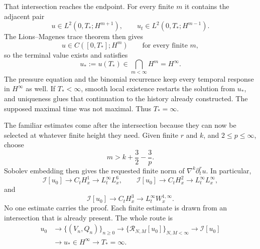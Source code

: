\documentclass[11pt]{article}
\begin{document}
That intersection reaches the endpoint. For every finite $m$ it contains the adjacent pair
\[
u\in L^2(0,T_*;H^{m+1}),
\qquad
u_t\in L^2(0,T_*;H^{m-1}).
\]
The Lions--Magenes trace theorem then gives
\[
u\in C([0,T_*];H^m)
\qquad\text{for every finite }m,
\]
so the terminal value exists and satisfies
\[
u_*:=u(T_*)\in\bigcap_{m<\infty}H^m=H^\infty.
\]
The pressure equation and the binomial recurrence keep every temporal response in $H^\infty$ as well. If $T_*<\infty$, smooth local existence restarts the solution from $u_*$, and uniqueness glues that continuation to the history already constructed. The supposed maximal time was not maximal. Thus $T_*=\infty$.

The familiar estimates come after the intersection because they can now be selected at whatever finite height they need. Given finite $r$ and $k$, and $2\le p\le\infty$, choose
\[
m>k+\frac32-\frac3p.
\]
Sobolev embedding then gives the requested finite norm of $\nabla^k\partial_t^ru$. In particular,
\[
\mathcal I[u_0]\longrightarrow C_tH_x^1
\longrightarrow L_t^\infty L_x^6,
\qquad
\mathcal I[u_0]\longrightarrow C_tH_x^2
\longrightarrow L_t^\infty L_x^\infty,
\]
and
\[
\mathcal I[u_0]\longrightarrow C_tH_x^3
\longrightarrow L_t^\infty W_x^{1,\infty}.
\]
No one estimate carries the proof. Each finite estimate is drawn from an intersection that is already present. The whole route is
\[
\begin{aligned}
u_0
&\longrightarrow \{(V_n,Q_n)\}_{n\ge0}
\longrightarrow \{\mathcal R_{N,M}[u_0]\}_{N,M<\infty}
\longrightarrow \mathcal I[u_0]\\
&\longrightarrow u_*\in H^\infty
\longrightarrow T_*=\infty.
\end{aligned}
\]
\end{document}
